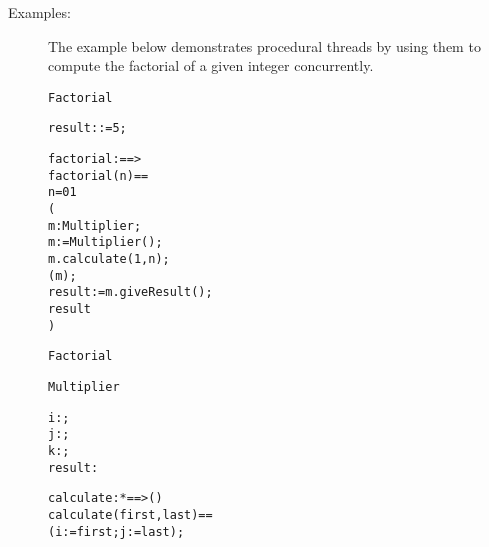\documentclass[\pformat,12pt]{article}
\begin{document}
\begin{description}
%
%
\item[Examples:]  \mbox{}
The example below demonstrates procedural threads by using them to
compute the factorial of a given integer concurrently. 

\begin{alltt}
     Factorial

     
      result :  := 5;

     factorial :  ==> 
    factorial(n) == 
       n = 0   1
       (
         m : Multiplier;
        m :=  Multiplier();
        m.calculate(1,n);
        (m);
        result:= m.giveResult();
         result
      )

     Factorial

     Multiplier

     
      i : ;
      j : ; 
      k : ;  
      result : 


     calculate :  *  ==> ()
    calculate (first, last) ==  
      (i := first; j := last);


\end{alltt}
\end{description}
\end{document}
